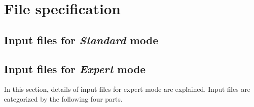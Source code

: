 \chapter{File specification}
\label{Ch:HowToStandard}
\section{Input files for {\it Standard} mode}


\section{Input files for {\it Expert} mode}
\label{Ch:HowToExpert}
In this section, details of input files for expert mode are explained. Input files are categorized by the following four parts.
